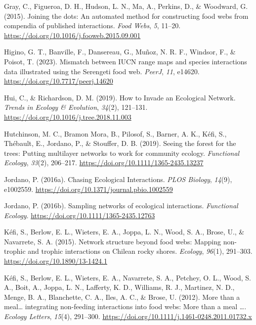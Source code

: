 \documentclass[
]{article}
\newlength{\cslhangindent}
\newenvironment{CSLReferences}[2] %
 {\begin{list}{}{%
  \setlength{\itemindent}{0pt}
  \setlength{\leftmargin}{0pt}
  \setlength{\parsep}{0pt}
  \ifodd #1
   \setlength{\leftmargin}{\cslhangindent}
   \setlength{\itemindent}{-1\cslhangindent}
  \fi
  \setlength{\itemsep}{#2\baselineskip}}}
 {\end{list}}
\begin{document}
\begin{CSLReferences}{1}{0}
Gray, C., Figueroa, D. H., Hudson, L. N., Ma, A., Perkins, D., \&
Woodward, G. (2015). Joining the dots: {An} automated method for
constructing food webs from compendia of published interactions.
\emph{Food Webs}, \emph{5}, 11--20.
\url{https://doi.org/10.1016/j.fooweb.2015.09.001}

Higino, G. T., Banville, F., Dansereau, G., Muñoz, N. R. F., Windsor,
F., \& Poisot, T. (2023). Mismatch between {IUCN} range maps and species
interactions data illustrated using the {Serengeti} food web.
\emph{PeerJ}, \emph{11}, e14620.
\url{https://doi.org/10.7717/peerj.14620}

Hui, C., \& Richardson, D. M. (2019). How to {Invade} an {Ecological
Network}. \emph{Trends in Ecology \& Evolution}, \emph{34}(2), 121--131.
\url{https://doi.org/10.1016/j.tree.2018.11.003}

Hutchinson, M. C., Bramon Mora, B., Pilosof, S., Barner, A. K., Kéfi,
S., Thébault, E., Jordano, P., \& Stouffer, D. B. (2019). Seeing the
forest for the trees: {Putting} multilayer networks to work for
community ecology. \emph{Functional Ecology}, \emph{33}(2), 206--217.
\url{https://doi.org/10.1111/1365-2435.13237}

Jordano, P. (2016a). Chasing {Ecological Interactions}. \emph{PLOS
Biology}, \emph{14}(9), e1002559.
\url{https://doi.org/10.1371/journal.pbio.1002559}

Jordano, P. (2016b). Sampling networks of ecological interactions.
\emph{Functional Ecology}. \url{https://doi.org/10.1111/1365-2435.12763}

Kéfi, S., Berlow, E. L., Wieters, E. A., Joppa, L. N., Wood, S. A.,
Brose, U., \& Navarrete, S. A. (2015). Network structure beyond food
webs: Mapping non-trophic and trophic interactions on {Chilean} rocky
shores. \emph{Ecology}, \emph{96}(1), 291--303.
\url{https://doi.org/10.1890/13-1424.1}

Kéfi, S., Berlow, E. L., Wieters, E. A., Navarrete, S. A., Petchey, O.
L., Wood, S. A., Boit, A., Joppa, L. N., Lafferty, K. D., Williams, R.
J., Martinez, N. D., Menge, B. A., Blanchette, C. A., Iles, A. C., \&
Brose, U. (2012). More than a meal{\ldots{}} integrating non-feeding
interactions into food webs: {More} than a meal {\ldots{}}.
\emph{Ecology Letters}, \emph{15}(4), 291--300.
\url{https://doi.org/10.1111/j.1461-0248.2011.01732.x}


\end{CSLReferences}
\end{document}
